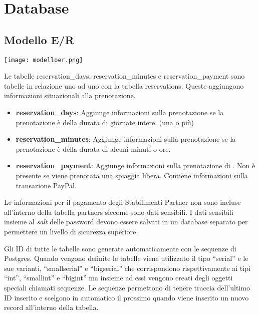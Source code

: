 \section{Database}

\subsection{Modello E/R}%
\label{sec:modelloer}

\texttt{[image: modelloer.png]}

Le tabelle reservation\_days, reservation\_minutes e reservation\_payment sono tabelle in relazione uno ad uno con la tabella reservations. Queste aggiungono informazioni situazionali alla prenotazione.

\begin{itemize}
    \item \textbf{reservation\_days}: Aggiunge informazioni sulla prenotazione se la prenotazione \`e della durata di giornate intere. (una o pi\`u)
    \item \textbf{reservation\_minutes}: Aggiunge informazioni sulla prenotazione se la prenotazione \`e della durata di alcuni minuti o ore.
    \item \textbf{reservation\_payment}: Aggiunge informazioni sulla prenotazione di . Non \`e presente se viene prenotata una spiaggia libera. Contiene informazioni sulla transazione PayPal.
\end{itemize}

Le informazioni per il pagamento degli Stabilimenti Partner non sono incluse all'interno della tabella partners siccome sono dati sensibili. I dati sensibili insieme al \emph{salt} delle password devono essere salvati in un database separato per permettere un livello di sicurezza superiore.

Gli ID di tutte le tabelle sono generate automaticamente con le sequenze di Postgres. Quando vengono definite le tabelle viene utilizzato il tipo ``serial'' e le sue varianti, ``smallserial'' e ``bigserial'' che corrispondono rispettivamente ai tipi ``int'', ``smallint'' e ``bigint'' ma insieme ad essi vengono creati degli oggetti speciali chiamati sequenze. Le sequenze permettono di tenere traccia dell'ultimo ID inserito e scelgono in automatico il prossimo quando viene inserito un nuovo record all'interno della tabella.
